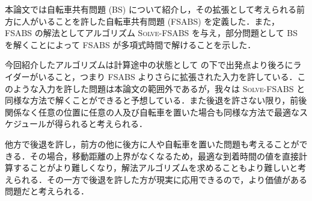 本論文では自転車共有問題 (BS) について紹介し，その拡張として考えられる前方に人がいることを許した自転車共有問題 (FSABS) を定義した．また， FSABS の解法としてアルゴリズム \textsc{Solve-FSABS} を与え，部分問題として BS を解くことによって FSABS が多項式時間で解けることを示した．

今回紹介したアルゴリズムは計算途中の状態として  の下で出発点より後ろにライダーがいること，つまり FSABS よりさらに拡張された入力を許している．このような入力を許した問題は本論文の範囲外であるが，我々は \textsc{Solve-FSABS} と同様な方法で解くことができると予想している．また後退を許さない限り，前後関係なく任意の位置に任意の人及び自転車を置いた場合も同様な方法で最適なスケジュールが得られると考えられる．

他方で後退を許し，前方の他に後方に人や自転車を置いた問題も考えることができる．その場合，移動距離の上界がなくなるため，最適な到着時間の値を直接計算することがより難しくなり，解法アルゴリズムを求めることもより難しいと考えられる．その一方で後退を許した方が現実に応用できるので，より価値がある問題だと考えられる．